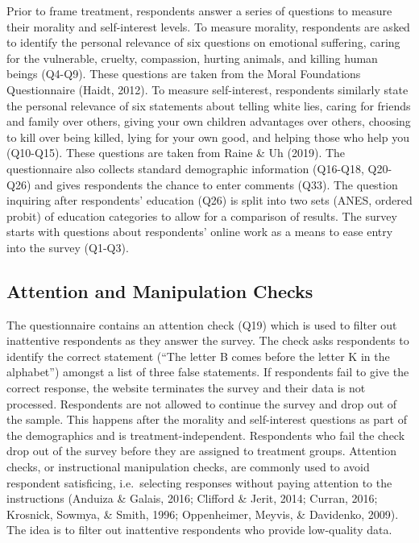 \documentclass[12pt,econ]{sources/authesis}
\begin{document}
Prior to frame treatment, respondents answer a series of questions to measure their morality and self-interest levels. To measure morality, respondents are asked to identify the personal relevance of six questions on emotional suffering, caring for the vulnerable, cruelty, compassion, hurting animals, and killing human beings (Q4-Q9). These questions are taken from the Moral Foundations Questionnaire (Haidt, 2012). To measure self-interest, respondents similarly state the personal relevance of six statements about telling white lies, caring for friends and family over others, giving your own children advantages over others, choosing to kill over being killed, lying for your own good, and helping those who help you (Q10-Q15). These questions are taken from Raine \& Uh (2019). The questionnaire also collects standard demographic information (Q16-Q18, Q20-Q26) and gives respondents the chance to enter comments (Q33). The question inquiring after respondents' education (Q26) is split into two sets (ANES, ordered probit) of education categories to allow for a comparison of results. The survey starts with questions about respondents' online work as a means to ease entry into the survey (Q1-Q3).

\hypertarget{framing-design-checks}{%
\subsection{Attention and Manipulation Checks}\label{framing-design-checks}}

The questionnaire contains an attention check (Q19) which is used to filter out inattentive respondents as they answer the survey. The check asks respondents to identify the correct statement (``The letter B comes before the letter K in the alphabet'') amongst a list of three false statements. If respondents fail to give the correct response, the website terminates the survey and their data is not processed. Respondents are not allowed to continue the survey and drop out of the sample. This happens after the morality and self-interest questions as part of the demographics and is treatment-independent. Respondents who fail the check drop out of the survey before they are assigned to treatment groups. Attention checks, or instructional manipulation checks, are commonly used to avoid respondent satisficing, i.e.~selecting responses without paying attention to the instructions (Anduiza \& Galais, 2016; Clifford \& Jerit, 2014; Curran, 2016; Krosnick, Sowmya, \& Smith, 1996; Oppenheimer, Meyvis, \& Davidenko, 2009). The idea is to filter out inattentive respondents who provide low-quality data.
\end{document}
